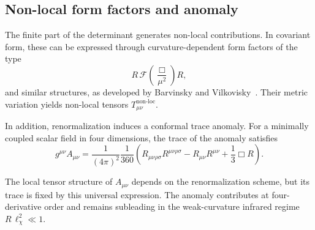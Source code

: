 \subsection{Non-local form factors and anomaly}
  \label{subsec:nonlocal-anomaly}

  The finite part of the determinant generates non-local contributions.
  In covariant form, these can be expressed through curvature-dependent
  form factors of the type
  \begin{equation}
    R \,\mathcal{F}\!\left(\frac{\Box}{\mu^2}\right) R ,
  \end{equation}
  and similar structures, as developed by
  Barvinsky and Vilkovisky~\cite{BarvinskyVilkovisky1985,BarvinskyVilkovisky1990}.
  Their metric variation yields non-local tensors
  $T^{\mathrm{non\mbox{-}loc}}_{\mu\nu}$.

  In addition, renormalization induces a conformal trace anomaly.
  For a minimally coupled scalar field in four dimensions,
  the trace of the anomaly satisfies~\cite{BirrellDavies1982,Vassilevich2003}
  \begin{equation}
    g^{\mu\nu} A_{\mu\nu}
    =
    \frac{1}{(4\pi)^2}
    \frac{1}{360}
    \left(
      R_{\mu\nu\rho\sigma} R^{\mu\nu\rho\sigma}
      -
      R_{\mu\nu} R^{\mu\nu}
      +
      \frac{1}{3} \Box R
    \right).
  \end{equation}

  The local tensor structure of $A_{\mu\nu}$ depends on the
  renormalization scheme, but its trace is fixed by this universal expression.
  The anomaly contributes at four-derivative order and remains subleading
  in the weak-curvature infrared regime $R\,\ell_\chi^2 \ll 1$.
